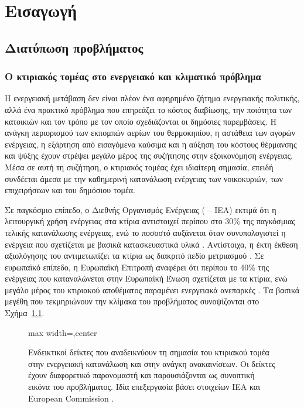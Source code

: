 \chapter{Εισαγωγή}
\label{chap:introduction}

\section{Διατύπωση προβλήματος}

\subsection{Ο κτιριακός τομέας στο ενεργειακό και κλιματικό πρόβλημα}

Η ενεργειακή μετάβαση δεν είναι πλέον ένα αφηρημένο ζήτημα ενεργειακής
πολιτικής, αλλά ένα πρακτικό πρόβλημα που επηρεάζει το κόστος διαβίωσης, την
ποιότητα των κατοικιών και τον τρόπο με τον οποίο σχεδιάζονται οι δημόσιες
παρεμβάσεις. Η ανάγκη περιορισμού των εκπομπών αερίων του θερμοκηπίου, η
αστάθεια των αγορών ενέργειας, η εξάρτηση από εισαγόμενα καύσιμα και η αύξηση
του κόστους θέρμανσης και ψύξης έχουν στρέψει μεγάλο μέρος της συζήτησης στην
εξοικονόμηση ενέργειας. Μέσα σε αυτή τη συζήτηση, ο κτιριακός τομέας έχει
ιδιαίτερη σημασία, επειδή συνδέεται άμεσα με την καθημερινή κατανάλωση
ενέργειας των νοικοκυριών, των επιχειρήσεων και του δημόσιου τομέα.

Σε παγκόσμιο επίπεδο, ο Διεθνής Οργανισμός Ενέργειας
( -- IEA) εκτιμά ότι η
λειτουργική χρήση ενέργειας στα κτίρια αντιστοιχεί περίπου στο 30\% της
παγκόσμιας τελικής κατανάλωσης ενέργειας, ενώ το ποσοστό αυξάνεται όταν
συνυπολογιστεί η ενέργεια που σχετίζεται με βασικά κατασκευαστικά υλικά
\cite{iea_buildings_2026}. Αντίστοιχα, η έκτη έκθεση αξιολόγησης του
 αντιμετωπίζει τα κτίρια ως
διακριτό πεδίο μετριασμού \cite{ipcc_ar6_wg3_buildings}. Σε ευρωπαϊκό επίπεδο,
η Ευρωπαϊκή Επιτροπή αναφέρει ότι περίπου το 40\% της ενέργειας που
καταναλώνεται στην Ευρωπαϊκή Ένωση σχετίζεται με τα κτίρια, ενώ μεγάλο μέρος
του κτιριακού αποθέματος παραμένει ενεργειακά ανεπαρκές
\cite{ec_epbd_page_2026,ec_epbd_news_2025}. Τα βασικά μεγέθη που τεκμηριώνουν
την κλίμακα του προβλήματος συνοψίζονται στο Σχήμα~\ref{fig:buildings-energy-context}.

\begin{figure}[!htbp]
    \centering
    \begin{adjustbox}{max width=\textwidth,center}
        
    \end{adjustbox}
    \caption[Ενδεικτικοί δείκτες για τον κτιριακό τομέα και την ανάγκη ανακαινίσεων]{Ενδεικτικοί δείκτες που αναδεικνύουν τη σημασία του κτιριακού τομέα στην ενεργειακή κατανάλωση και στην ανάγκη ανακαινίσεων. Οι δείκτες έχουν διαφορετικό παρονομαστή και παρουσιάζονται ως συνοπτική εικόνα του προβλήματος. Ιδία επεξεργασία βάσει στοιχείων IEA και European Commission \cite{iea_buildings_2026,ec_epbd_page_2026,ec_epbd_news_2025}.}
    \label{fig:buildings-energy-context}
\end{figure}

